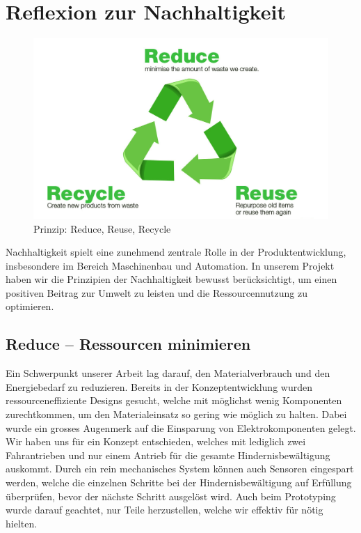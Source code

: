 \documentclass[../main.tex]{subfiles}
\begin{document}
\newpage
\section{Reflexion zur Nachhaltigkeit}

\begin{figure}[H] %
    \centering
        \includegraphics[width=0.7\linewidth]{img/nachhaltigkeit/3R-reduce-reuse-recycle.jpg}
        \caption[Prinzip: Reduce, Reuse, Recycle]{Prinzip: Reduce, Reuse, Recycle \footnotemark}
        
        \label{fig:3R}
    \end{figure} 


Nachhaltigkeit spielt eine zunehmend zentrale Rolle in der Produktentwicklung, insbesondere im Bereich Maschinenbau und Automation. In unserem Projekt haben wir die Prinzipien der Nachhaltigkeit bewusst berücksichtigt, um einen positiven Beitrag zur Umwelt zu leisten und die Ressourcennutzung zu optimieren.

\subsection{Reduce – Ressourcen minimieren}

Ein Schwerpunkt unserer Arbeit lag darauf, den Materialverbrauch und den Energiebedarf zu reduzieren. Bereits in der Konzeptentwicklung wurden ressourceneffiziente Designs gesucht, welche mit möglichst wenig Komponenten zurechtkommen, um den Materialeinsatz so gering wie möglich zu halten. Dabei wurde ein grosses Augenmerk auf die Einsparung von Elektrokomponenten gelegt. Wir haben uns für ein Konzept entschieden, welches mit lediglich zwei Fahrantrieben und nur einem Antrieb für die gesamte Hindernisbewältigung auskommt. Durch ein rein mechanisches System können auch Sensoren eingespart werden, welche die einzelnen Schritte bei der Hindernisbewältigung auf Erfüllung überprüfen, bevor der nächste Schritt ausgelöst wird. Auch beim Prototyping wurde darauf geachtet, nur Teile herzustellen, welche wir effektiv für nötig hielten. 
\end{document}
